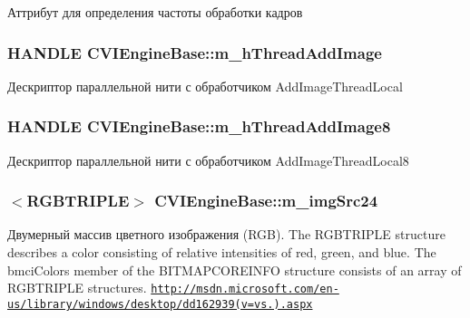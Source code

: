 Аттрибут для определения частоты обработки кадров 

\hypertarget{class_c_v_i_engine_base_a4d289b3028ab2b3c1a91bf08de42144e}{
\subsubsection[{m\+\_\+h\+Thread\+Add\+Image}]{\setlength{\rightskip}{0pt plus 5cm}H\+A\+N\+D\+L\+E C\+V\+I\+Engine\+Base\+::m\+\_\+h\+Thread\+Add\+Image}}\label{class_c_v_i_engine_base_a4d289b3028ab2b3c1a91bf08de42144e}


Дескриптор параллельной нити с обработчиком Add\+Image\+Thread\+Local 

\hypertarget{class_c_v_i_engine_base_a81b0c7b485feb8404fa06b2e91300d14}{
\subsubsection[{m\+\_\+h\+Thread\+Add\+Image8}]{\setlength{\rightskip}{0pt plus 5cm}H\+A\+N\+D\+L\+E C\+V\+I\+Engine\+Base\+::m\+\_\+h\+Thread\+Add\+Image8}}\label{class_c_v_i_engine_base_a81b0c7b485feb8404fa06b2e91300d14}


Дескриптор параллельной нити с обработчиком Add\+Image\+Thread\+Local8 

\hypertarget{class_c_v_i_engine_base_a252e6e1285e6063718c7d7a874298363}{
\subsubsection[{m\+\_\+img\+Src24}]{$<$R\+G\+B\+T\+R\+I\+P\+L\+E$>$ C\+V\+I\+Engine\+Base\+::m\+\_\+img\+Src24}}\label{class_c_v_i_engine_base_a252e6e1285e6063718c7d7a874298363}


Двумерный массив цветного изображения (R\+G\+B). The R\+G\+B\+T\+R\+I\+P\+L\+E structure describes a color consisting of relative intensities of red, green, and blue. The bmci\+Colors member of the B\+I\+T\+M\+A\+P\+C\+O\+R\+E\+I\+N\+F\+O structure consists of an array of R\+G\+B\+T\+R\+I\+P\+L\+E structures. \href{http://msdn.microsoft.com/en-us/library/windows/desktop/dd162939(v=vs.85).aspx}{\tt http\+://msdn.\+microsoft.\+com/en-\/us/library/windows/desktop/dd162939(v=vs.).\+aspx} 

